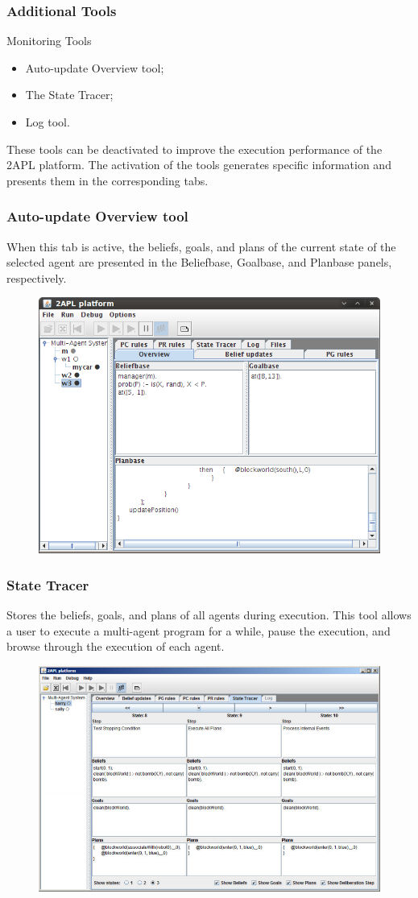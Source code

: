 \documentclass{beamer}
\begin{document}
\begin{frame}
\frametitle{Additional Tools}
	\begin{block}{Monitoring Tools}
	\begin{itemize}
   	\item Auto-update Overview tool;
    \item The State Tracer;
	\item Log tool.
    \end{itemize} 
	\end{block}
    
    These tools can be deactivated to improve the execution performance of the 2APL platform. The activation of the tools generates specific information and presents them in the corresponding tabs. 
	
\end{frame}

\begin{frame}
\frametitle{Auto-update Overview tool}
When this tab is active, the beliefs, goals, and plans of the current state of the selected agent are presented in the Beliefbase, Goalbase, and Planbase panels, respectively.

	\begin{figure}
	\includegraphics[width=0.65\linewidth]{images/2APLplatform.png}
	\end{figure}
\end{frame}

\begin{frame}
\frametitle{State Tracer}
Stores the beliefs, goals, and plans of all agents during execution. This tool allows a user to execute a multi-agent program for a while, pause the execution, and browse through the execution of each agent.

	\begin{figure}
	\includegraphics[width=0.65\linewidth]{images/2APLStateTracer.png}
	\end{figure}
\end{frame}
\end{document}
